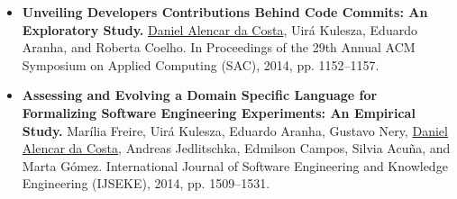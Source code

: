 \begin{sloppypar}
\begin{itemize}
	\item \textbf{Unveiling Developers Contributions Behind Code Commits: An
		Exploratory Study.} \underline{Daniel Alencar da Costa}, Uir\'{a} Kulesza, Eduardo Aranha,
		and Roberta Coelho. In Proceedings of the 29th Annual ACM Symposium on Applied
		Computing (SAC), 2014, pp. 1152--1157.

\item \textbf{Assessing and Evolving a Domain Specific Language for Formalizing Software
	Engineering Experiments: An Empirical Study.} Mar\'{i}lia Freire, Uir\'{a}
	Kulesza, Eduardo Aranha, Gustavo Nery, \underline{Daniel Alencar da Costa},
	Andreas Jedlitschka, Edmilson Campos, Silvia Acu\~{n}a, and Marta G\'{o}mez.
	International Journal of Software Engineering and Knowledge Engineering
	(IJSEKE), 2014, pp. 1509--1531.

\end{itemize}

\end{sloppypar}
\newpage

